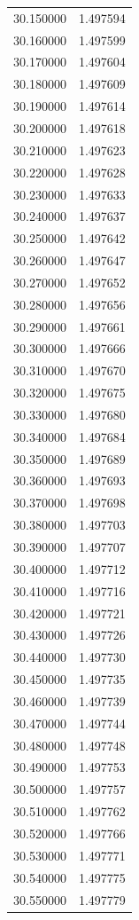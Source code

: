 \begin{tabular}{rr}
30.150000 & 1.497594 \\
30.160000 & 1.497599 \\
30.170000 & 1.497604 \\
30.180000 & 1.497609 \\
30.190000 & 1.497614 \\
30.200000 & 1.497618 \\
30.210000 & 1.497623 \\
30.220000 & 1.497628 \\
30.230000 & 1.497633 \\
30.240000 & 1.497637 \\
30.250000 & 1.497642 \\
30.260000 & 1.497647 \\
30.270000 & 1.497652 \\
30.280000 & 1.497656 \\
30.290000 & 1.497661 \\
30.300000 & 1.497666 \\
30.310000 & 1.497670 \\
30.320000 & 1.497675 \\
30.330000 & 1.497680 \\
30.340000 & 1.497684 \\
30.350000 & 1.497689 \\
30.360000 & 1.497693 \\
30.370000 & 1.497698 \\
30.380000 & 1.497703 \\
30.390000 & 1.497707 \\
30.400000 & 1.497712 \\
30.410000 & 1.497716 \\
30.420000 & 1.497721 \\
30.430000 & 1.497726 \\
30.440000 & 1.497730 \\
30.450000 & 1.497735 \\
30.460000 & 1.497739 \\
30.470000 & 1.497744 \\
30.480000 & 1.497748 \\
30.490000 & 1.497753 \\
30.500000 & 1.497757 \\
30.510000 & 1.497762 \\
30.520000 & 1.497766 \\
30.530000 & 1.497771 \\
30.540000 & 1.497775 \\
30.550000 & 1.497779 \\

\end{tabular}
